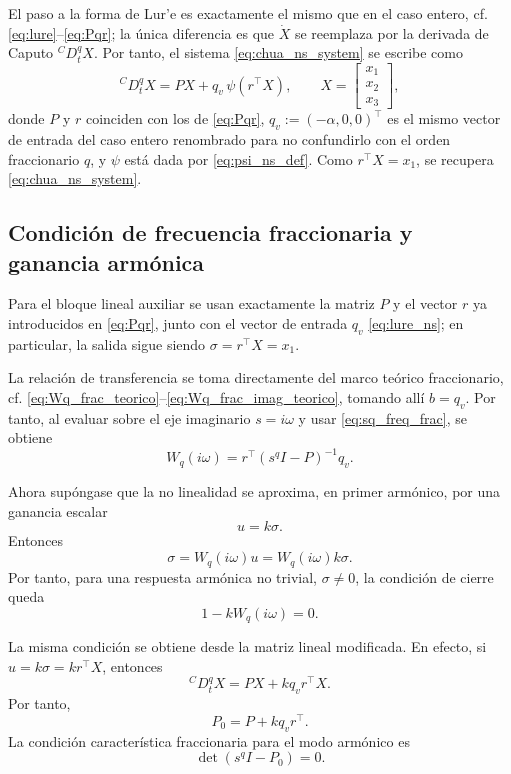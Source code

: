 \documentclass[journal]{IEEEtran}
\begin{document}
El paso a la forma de Lur'e es exactamente el mismo que en el caso entero, cf. \eqref{eq:lure}--\eqref{eq:Pqr}; la única diferencia es que \(\dot X\) se reemplaza por la derivada de Caputo \({}^{C}D_t^q X\). Por tanto, el sistema \eqref{eq:chua_ns_system} se escribe como
\begin{equation}
\label{eq:lure_ns}
{}^{C}D_t^q X=P X+q_v\,\psi(r^\top X),
\qquad
X=\begin{bmatrix}x_1\\x_2\\x_3\end{bmatrix},
\end{equation}
donde \(P\) y \(r\) coinciden con los de \eqref{eq:Pqr}, \(q_v:=(-\alpha,0,0)^\top\) es el mismo vector de entrada del caso entero renombrado para no confundirlo con el orden fraccionario \(q\), y \(\psi\) está dada por \eqref{eq:psi_ns_def}. Como \(r^\top X=x_1\), se recupera \eqref{eq:chua_ns_system}.

\subsection{Condición de frecuencia fraccionaria y ganancia armónica}

Para el bloque lineal auxiliar se usan exactamente la matriz \(P\) y el vector
\(r\) ya introducidos en \eqref{eq:Pqr}, junto con el vector de entrada
\(q_v\) \eqref{eq:lure_ns}; en particular, la salida sigue siendo
\(\sigma=r^\top X=x_1\).

La relación de transferencia se toma directamente del marco teórico
fraccionario, cf. \eqref{eq:Wq_frac_teorico}--\eqref{eq:Wq_frac_imag_teorico},
tomando allí \(b=q_v\). Por tanto, al evaluar sobre el eje imaginario
\(s=i\omega\) y usar \eqref{eq:sq_freq_frac}, se obtiene
\begin{equation}
\label{eq:Wplus_ns}
W_q(i\omega)
=
r^\top\left(s^q I-P\right)^{-1}q_v.
\end{equation}

Ahora supóngase que la no linealidad se aproxima, en primer armónico, por una
ganancia escalar
\[
u=k\sigma.
\]
Entonces
\[
\sigma
=
W_q(i\omega)u
=
W_q(i\omega)k\sigma.
\]
Por tanto, para una respuesta armónica no trivial, \(\sigma\neq 0\), la condición de cierre queda
\begin{equation}
\label{eq:det_condition_ns}
1-kW_q(i\omega)=0.
\end{equation}

La misma condición se obtiene desde la matriz lineal modificada. En efecto, si
\(u=k\sigma=k r^\top X\), entonces
\[
{}^C D_t^q X
=
PX+kq_vr^\top X.
\]
Por tanto,
\begin{equation}
\label{eq:P0_ns}
P_0=P+kq_vr^\top.
\end{equation}
La condición característica fraccionaria para el modo armónico es
\[
\det\left(s^q I-P_0\right)=0.
\]
\end{document}
